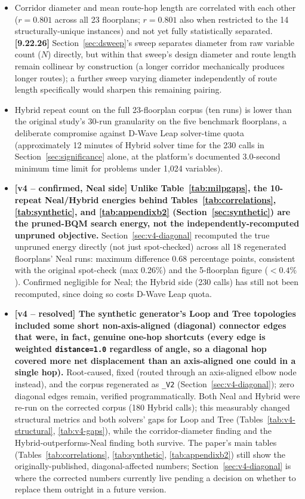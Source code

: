 \documentclass[11pt]{article}
\begin{document}
\begin{itemize}[leftmargin=*]
\item Corridor diameter and mean route-hop length are correlated with each other ($r=0.801$ across all 23 floorplans; $r=0.801$ also when restricted to the 14 structurally-unique instances) and not yet fully statistically separated. \textbf{[9.22.26]} Section~\ref{sec:dsweep}'s sweep separates diameter from raw variable count ($N$) directly, but within that sweep's design diameter and route length remain collinear by construction (a longer corridor mechanically produces longer routes); a further sweep varying diameter independently of route length specifically would sharpen this remaining pairing.
\item Hybrid repeat count on the full 23-floorplan corpus (ten runs) is lower than the original study's 30-run granularity on the five benchmark floorplans, a deliberate compromise against D-Wave Leap solver-time quota (approximately 12 minutes of Hybrid solver time for the 230 calls in Section~\ref{sec:significance} alone, at the platform's documented 3.0-second minimum time limit for problems under 1,024 variables).
\item \textbf{\textbf{[v4 -- confirmed, Neal side]} Unlike Table~\ref{tab:milpgaps}, the 10-repeat Neal/Hybrid energies behind Tables~\ref{tab:correlations}, \ref{tab:synthetic}, and \ref{tab:appendixb2} (Section~\ref{sec:synthetic}) are the pruned-BQM search energy, not the independently-recomputed unpruned objective.} Section~\ref{sec:v4-diagonal} recomputed the true unpruned energy directly (not just spot-checked) across all 18 regenerated floorplans' Neal runs: maximum difference 0.68 percentage points, consistent with the original spot-check (max 0.26\%) and the 5-floorplan figure ($<0.4\%$). Confirmed negligible for Neal; the Hybrid side (230 calls) has still not been recomputed, since doing so costs D-Wave Leap quota.
\item \textbf{\textbf{[v4 -- resolved]} The synthetic generator's Loop and Tree topologies included some short non-axis-aligned (diagonal) connector edges that were, in fact, genuine one-hop shortcuts (every edge is weighted \texttt{distance=1.0} regardless of angle, so a diagonal hop covered more net displacement than an axis-aligned one could in a single hop).} Root-caused, fixed (routed through an axis-aligned elbow node instead), and the corpus regenerated as \texttt{\_V2} (Section~\ref{sec:v4-diagonal}); zero diagonal edges remain, verified programmatically. Both Neal and Hybrid were re-run on the corrected corpus (180 Hybrid calls); this measurably changed structural metrics and both solvers' gaps for Loop and Tree (Tables~\ref{tab:v4-structural}, \ref{tab:v4-gaps}), while the corridor-diameter finding and the Hybrid-outperforms-Neal finding both survive. The paper's main tables (Tables~\ref{tab:correlations}, \ref{tab:synthetic}, \ref{tab:appendixb2}) still show the originally-published, diagonal-affected numbers; Section~\ref{sec:v4-diagonal} is where the corrected numbers currently live pending a decision on whether to replace them outright in a future version.

\end{itemize}
\end{document}
